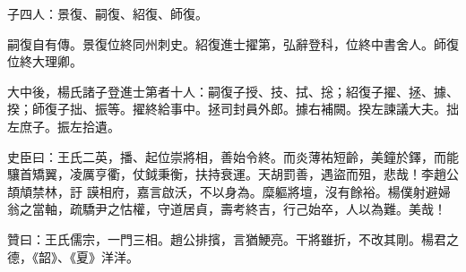 \begin{pinyinscope}
 子四人：景復、嗣復、紹復、師復。



 嗣復自有傳。景復位終同州刺史。紹復進士擢第，弘辭登科，位終中書舍人。師復位終大理卿。



 大中後，楊氏諸子登進士第者十人：嗣復子授、技、拭、捴；紹復子擢、拯、據、揆；師復子拙、振等。擢終給事中。拯司封員外郎。據右補闕。揆左諫議大夫。拙左庶子。振左拾遺。



 史臣曰：王氏二英，播、起位崇將相，善始令終。而炎薄祐短齡，美鐘於鐸，而能驤首矯翼，凌厲亨衢，仗鉞秉衡，扶持衰運。天胡罰善，遇盜而殂，悲哉！李趙公頡頏禁林，訏
 謨相府，嘉言啟沃，不以身為。糜軀將壇，沒有餘裕。楊僕射避婦翁之當軸，疏驕尹之怙權，守道居貞，壽考終吉，行己始卒，人以為難。美哉！



 贊曰：王氏儒宗，一門三相。趙公排擯，言猶鯁亮。干將雖折，不改其剛。楊君之德，《韶》、《夏》洋洋。



\end{pinyinscope}